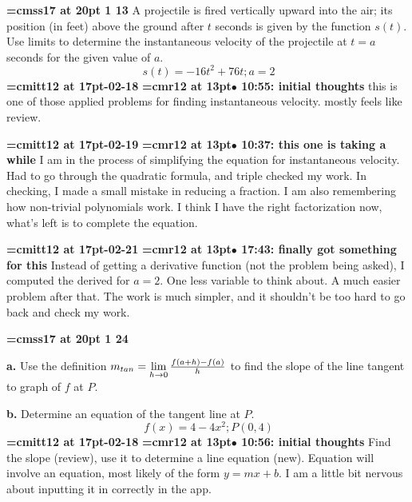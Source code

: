 {\medskip\noindent\bf\font\titlefont=cmss17 at 20pt 1 13}\medskip
A projectile is fired vertically upward into the air; its
position (in feet) above the ground after $t$ seconds is
given by the function $s(t)$. Use limits to determine the
instantaneous velocity of the projectile at $t = a$ seconds
for the given value of $a$.
$$\
s(t) = -16t^2 + 76t; a = 2
$$
{\medskip\noindent\bf\font\titlefont=cmitt12 at 17pt-02-18}\medskip
{\smallskip\noindent\bf\font\titlefont=cmr12 at 13pt\titlefont $\bullet$ 10:55: initial thoughts}\smallskip
this is one of those applied problems for finding instantaneous velocity. mostly feels like review.
\par

{\medskip\noindent\bf\font\titlefont=cmitt12 at 17pt-02-19}\medskip
{\smallskip\noindent\bf\font\titlefont=cmr12 at 13pt\titlefont $\bullet$ 10:37: this one is taking a while}\smallskip
I am in the process of simplifying the equation for instantaneous velocity. Had to go through the quadratic formula, and triple checked my work. In checking, I made a small mistake in reducing a fraction. I am also remembering how non-trivial polynomials work. I think I have the right factorization now, what's left is to complete the equation.
\par

{\medskip\noindent\bf\font\titlefont=cmitt12 at 17pt-02-21}\medskip
{\smallskip\noindent\bf\font\titlefont=cmr12 at 13pt\titlefont $\bullet$ 17:43: finally got something for this}\smallskip
Instead of getting a derivative function (not the problem being asked), I computed the derived for $a = 2$. One less variable to think about. A much easier problem after that. The work is much simpler, and it shouldn't be too hard to go back and check my work.
\par

{\medskip\noindent\bf\font\titlefont=cmss17 at 20pt 1 24}\medskip
\par {\bf a.} Use the definition $m_{tan} =
\lim\limits_{h \to 0}{f(a + h) - f(a) \over h}$ to find
the slope of the line tangent to graph of $f$ at $P$.
\par {\bf b.} Determine an equation of the tangent line at $P$.
$$\
f(x) = 4 - 4x^2; P(0, 4)
$$
{\medskip\noindent\bf\font\titlefont=cmitt12 at 17pt-02-18}\medskip
{\smallskip\noindent\bf\font\titlefont=cmr12 at 13pt\titlefont $\bullet$ 10:56: initial thoughts}\smallskip
Find the slope (review), use it to determine a line equation (new). Equation will involve an equation, most likely of the form $y = mx + b$. I am a little bit nervous about inputting it in correctly in the app.
\par

